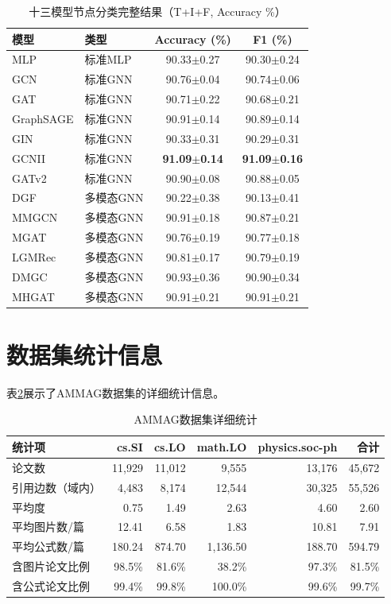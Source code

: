 \begin{appendices}
\begin{table}[htbp]
  \centering
  \caption{十三模型节点分类完整结果（T+I+F, Accuracy \%）}
  \label{tab:full_12model}
  \small
  \begin{tabular}{llcc}
    \toprule
    模型 & 类型 & Accuracy (\%) & F1 (\%) \\
    \midrule
    MLP & 标准MLP & 90.33$\pm$0.27 & 90.30$\pm$0.24 \\
    GCN & 标准GNN & 90.76$\pm$0.04 & 90.74$\pm$0.06 \\
    GAT & 标准GNN & 90.71$\pm$0.22 & 90.68$\pm$0.21 \\
    GraphSAGE & 标准GNN & 90.91$\pm$0.14 & 90.89$\pm$0.14 \\
    GIN & 标准GNN & 90.33$\pm$0.31 & 90.29$\pm$0.31 \\
    GCNII & 标准GNN & \textbf{91.09$\pm$0.14} & \textbf{91.09$\pm$0.16} \\
    GATv2 & 标准GNN & 90.90$\pm$0.08 & 90.88$\pm$0.05 \\
    \midrule
    DGF & 多模态GNN & 90.22$\pm$0.38 & 90.13$\pm$0.41 \\
    MMGCN & 多模态GNN & 90.91$\pm$0.18 & 90.87$\pm$0.21 \\
    MGAT & 多模态GNN & 90.76$\pm$0.19 & 90.77$\pm$0.18 \\
    LGMRec & 多模态GNN & 90.81$\pm$0.17 & 90.79$\pm$0.19 \\
    DMGC & 多模态GNN & 90.93$\pm$0.36 & 90.90$\pm$0.34 \\
    MHGAT & 多模态GNN & 90.91$\pm$0.21 & 90.91$\pm$0.21 \\
    \bottomrule
  \end{tabular}
\end{table}

\section{数据集统计信息}

表\ref{tab:full_stats}展示了AMMAG数据集的详细统计信息。

\begin{table}[htbp]
  \centering
  \caption{AMMAG数据集详细统计}
  \label{tab:full_stats}
  \begin{tabular}{lrrrrr}
    \toprule
    统计项 & cs.SI & cs.LO & math.LO & physics.soc-ph & 合计 \\
    \midrule
    论文数 & 11,929 & 11,012 & 9,555 & 13,176 & 45,672 \\
    引用边数（域内） & 4,483 & 8,174 & 12,544 & 30,325 & 55,526 \\
    平均度 & 0.75 & 1.49 & 2.63 & 4.60 & 2.60 \\
    平均图片数/篇 & 12.41 & 6.58 & 1.83 & 10.81 & 7.91 \\
    平均公式数/篇 & 180.24 & 874.70 & 1,136.50 & 188.70 & 594.79 \\
    含图片论文比例 & 98.5\% & 81.6\% & 38.2\% & 97.3\% & 81.5\% \\
    含公式论文比例 & 99.4\% & 99.8\% & 100.0\% & 99.6\% & 99.7\% \\
    \bottomrule
  \end{tabular}
\end{table}

\end{appendices}
